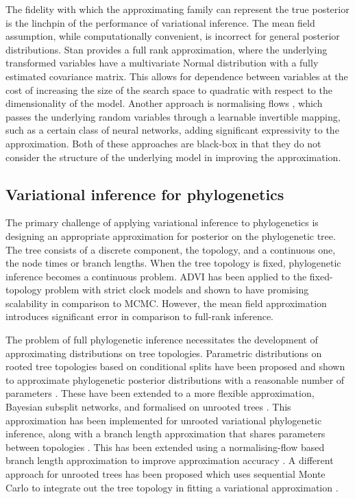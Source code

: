 \documentclass{article}
\begin{document}
The fidelity with which the approximating family can represent the true posterior is the linchpin of the performance of variational inference. The mean field assumption, while computationally convenient, is incorrect for general posterior distributions. Stan provides a full rank approximation, where the underlying transformed variables have a multivariate Normal distribution with a fully estimated covariance matrix. This allows for dependence between variables at the cost of increasing the size of the search space to quadratic with respect to the dimensionality of the model. Another approach is normalising flows \cite{rezende2015variational}, which passes the underlying random variables through a learnable invertible mapping, such as a certain class of neural networks, adding significant expressivity to the approximation. Both of these approaches are black-box in that they do not consider the structure of the underlying model in improving the approximation.

\subsection*{Variational inference for phylogenetics}

The primary challenge of applying variational inference to phylogenetics is designing an appropriate approximation for posterior on the phylogenetic tree. The tree consists of a discrete component, the topology, and a continuous one, the node times or branch lengths. When the tree topology is fixed, phylogenetic inference becomes a continuous problem. ADVI has been applied to the fixed-topology problem with strict clock models \cite{fourment2019evaluating, fourment202019} and shown to have promising scalability in comparison to MCMC. However, the mean field approximation introduces significant error in comparison to full-rank inference. 

The problem of full phylogenetic inference necessitates the development of approximating distributions on tree topologies. Parametric distributions on rooted tree topologies based on conditional splits have been proposed and shown to approximate phylogenetic posterior distributions with a reasonable number of parameters \cite{hohna2012guided, larget2013estimation}. These have been extended to a more flexible approximation, Bayesian subsplit networks, and formalised on unrooted trees \cite{zhang2018generalizing}. This approximation has been implemented for unrooted variational phylogenetic inference, along with a branch length approximation that shares parameters between topologies \cite{zhang2018variational}. This has been extended using a normalising-flow based branch length approximation to improve approximation accuracy \cite{zhang2020improved}. A different approach for unrooted trees has been proposed which uses sequential Monte Carlo to integrate out the tree topology in fitting a variational approximation \cite{moretti2020variational}.
\end{document}
